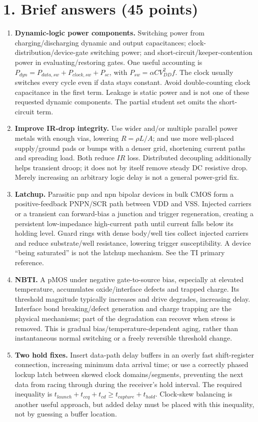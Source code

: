 \documentclass[10pt]{article}
\begin{document}
\section*{1. Brief answers (45 points)}
\begin{enumerate}[label=(\alph*),leftmargin=7mm,itemsep=7pt]
\item \textbf{Dynamic-logic power components.} Switching power from charging/discharging dynamic and output capacitances; clock-distribution/device-gate switching power; and short-circuit/keeper-contention power in evaluating/restoring gates. One useful accounting is $P_{dyn}=P_{data,sw}+P_{clock,sw}+P_{sc}$, with $P_{sw}=\alpha C V_{DD}^2f$. The clock usually switches every cycle even if data stays constant. Avoid double-counting clock capacitance in the first term. Leakage is static power and is not one of these requested dynamic components. The partial student set omits the short-circuit term.
\item \textbf{Improve IR-drop integrity.} Use wider and/or multiple parallel power metals with enough vias, lowering $R=\rho L/A$; and use more well-placed supply/ground pads or bumps with a denser grid, shortening current paths and spreading load. Both reduce $IR$ loss. Distributed decoupling additionally helps transient droop; it does not by itself remove steady DC resistive drop. Merely increasing an arbitrary logic delay is not a general power-grid fix.
\item \textbf{Latchup.} Parasitic pnp and npn bipolar devices in bulk CMOS form a positive-feedback PNPN/SCR path between VDD and VSS. Injected carriers or a transient can forward-bias a junction and trigger regeneration, creating a persistent low-impedance high-current path until current falls below its holding level. Guard rings with dense body/well ties collect injected carriers and reduce substrate/well resistance, lowering trigger susceptibility. A device ``being saturated'' is not the latchup mechanism. See the TI primary reference.
\item \textbf{NBTI.} A pMOS under negative gate-to-source bias, especially at elevated temperature, accumulates oxide/interface defects and trapped charge. Its threshold magnitude typically increases and drive degrades, increasing delay. Interface bond breaking/defect generation and charge trapping are the physical mechanisms; part of the degradation can recover when stress is removed. This is gradual bias/temperature-dependent aging, rather than instantaneous normal switching or a freely reversible threshold change.
\item \textbf{Two hold fixes.} Insert data-path delay buffers in an overly fast shift-register connection, increasing minimum data arrival time; or use a correctly phased lockup latch between skewed clock domains/segments, preventing the next data from racing through during the receiver's hold interval. The required inequality is $t_{launch}+t_{ccq}+t_{cd}\ge t_{capture}+t_{hold}$. Clock-skew balancing is another useful approach, but added delay must be placed with this inequality, not by guessing a buffer location.

\end{enumerate}
\end{document}
